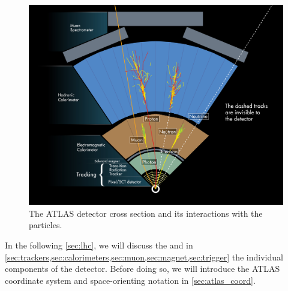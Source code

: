 \begin{figure}[htb]
    \centering
    \includegraphics[width=0.9\linewidth]{src/img/det_interactions.jpg}
    \caption{The ATLAS detector cross section and its interactions with the particles.}
    \label{fig:det_inter}
\end{figure}

In the following \cref{sec:lhc}, we will discuss the \LHC and in \cref{sec:trackers,sec:calorimeters,sec:muon,sec:magnet,sec:trigger} the individual components of the detector.
Before doing so, we will introduce the ATLAS coordinate system and space-orienting notation in \cref{sec:atlas_coord}.
